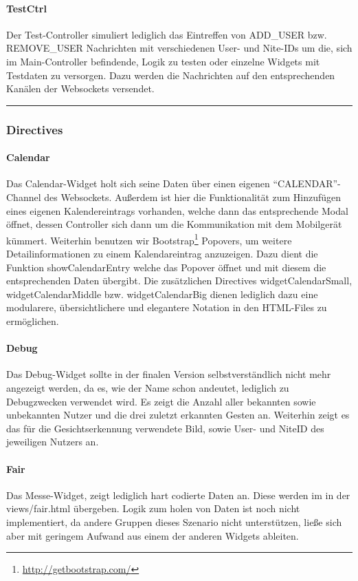 \documentclass[10pt,a4paper]{report}
\newcommand{\code}[1]{{\fontfamily{cmvtt}\selectfont #1}}
\newcommand{\HRule}{\rule{\linewidth}{0.1pt}} %
\begin{document}
				\paragraph{TestCtrl}
					Der Test-Controller simuliert lediglich das Eintreffen von \code{ADD\_USER} bzw. \code{REMOVE\_USER} Nachrichten mit verschiedenen User- und Nite-IDs um die, sich im Main-Controller befindende, Logik zu testen oder einzelne Widgets mit Testdaten zu versorgen. Dazu werden die Nachrichten auf den entsprechenden Kanälen der Websockets versendet.\\
				\HRule
			\subsubsection{Directives}
				\paragraph{Calendar}
					Das Calendar-Widget holt sich seine Daten über einen eigenen "`CALENDAR"'-Channel des Websockets. Außerdem ist hier die Funktionalität zum Hinzufügen eines eigenen Kalendereintrags vorhanden, welche dann das entsprechende Modal öffnet, dessen Controller sich dann um die Kommunikation mit dem Mobilgerät kümmert. Weiterhin benutzen wir Bootstrap\footnote{\href{http://getbootstrap.com/}{http://getbootstrap.com/}} Popovers, um weitere Detailinformationen zu einem Kalendareintrag anzuzeigen. Dazu dient die Funktion \code{showCalendarEntry} welche das Popover öffnet und mit diesem die entsprechenden Daten übergibt. Die zusätzlichen Directives \code{widgetCalendarSmall}, \code{widgetCalendarMiddle} bzw. \code{widgetCalendarBig} dienen lediglich dazu eine modularere, übersichtlichere und elegantere Notation in den HTML-Files zu ermöglichen.
				\paragraph{Debug}
					Das Debug-Widget sollte in der finalen Version selbstverständlich nicht mehr angezeigt werden, da es, wie der Name schon andeutet, lediglich zu Debugzwecken verwendet wird. Es zeigt die Anzahl aller bekannten sowie unbekannten Nutzer und die drei zuletzt erkannten Gesten an. Weiterhin zeigt es das für die Gesichtserkennung verwendete Bild, sowie User- und NiteID des jeweiligen Nutzers an. 
				\paragraph{Fair}
					Das Messe-Widget, zeigt lediglich hart codierte Daten an. Diese werden im in der \code{views/fair.html} übergeben. Logik zum holen von Daten ist noch nicht implementiert, da andere Gruppen dieses Szenario nicht unterstützen, ließe sich aber mit geringem Aufwand aus einem der anderen Widgets ableiten. 
\end{document}
